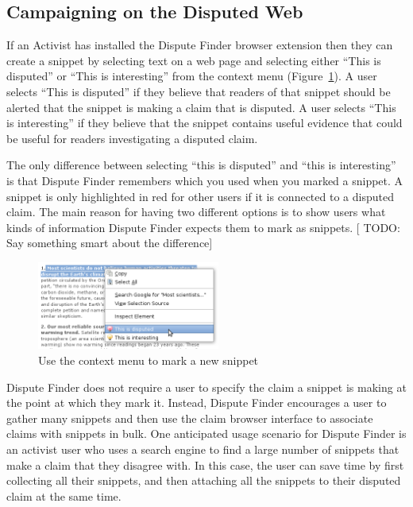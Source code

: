 \documentclass{www2010-submission}
\newcommand{\todo}[1]{{[\color{blue} TODO: #1]}}
\begin{document}
\subsection{Campaigning on the Disputed Web}

If an Activist has installed the Dispute Finder browser extension then they can create a snippet by selecting text on a web page and selecting either ``This is disputed'' or ``This is interesting'' from the context menu (Figure~\ref{createprocess}). A user selects ``This is disputed'' if they believe that readers of that snippet should be alerted that the snippet is making a claim that is disputed. A user selects ``This is interesting'' if they believe that the snippet contains useful evidence that could be useful for readers investigating a disputed claim. 

The only difference between selecting ``this is disputed'' and ``this is interesting'' is that Dispute Finder remembers which you used when you marked a snippet. A snippet is only highlighted in red for other users if it is connected to a disputed claim. The main reason for having two different options is to show users what kinds of information Dispute Finder expects them to mark as snippets.
\todo{Say something smart about the difference}

\begin{figure}[tb]
	\begin{center}
	\includegraphics[width=6cm]{../screenshots/v2_snipmark.png}
	\caption{Use the context menu to mark a new snippet}
	\label{createprocess}
	\end{center}
\end{figure}

Dispute Finder does not require a user to specify the claim a snippet is making at the point at which they mark it. Instead, Dispute Finder encourages a user to gather many snippets and then use the claim browser interface to associate claims with snippets in bulk.
One anticipated usage scenario for Dispute Finder is an activist user who uses a search engine to find a large number of snippets that make a claim that they disagree with. 
In this case, the user can save time by first collecting all their snippets, and then attaching all the snippets to their disputed claim at the same time.
\end{document}
